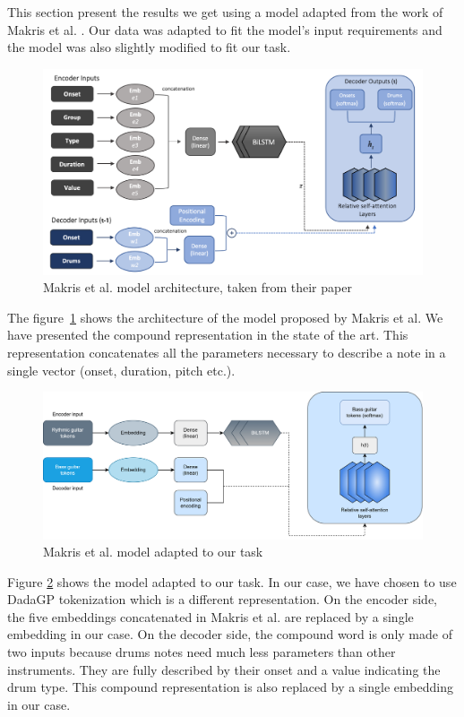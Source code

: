 This section present the results we get using a model adapted from the work of Makris et al. \cite{makris_conditional_2022}.
Our data was adapted to fit the model's input requirements and the model was also slightly modified to fit our task.

\begin{figure}[!ht]
    \centering
    \includegraphics[width=.75\linewidth]{../images-figures/makris_model.png}
    \caption{Makris et al. model architecture, taken from their paper \cite{makris_conditional_2022}}
    \label{fig:makris_model}
\end{figure}

The figure~\ref{fig:makris_model} shows the architecture of the model proposed by Makris et al.
We have presented the compound representation in the state of the art.
This representation concatenates all the parameters necessary to describe a note in a single vector (onset, duration, pitch etc.).

\begin{figure}[!ht]
    \centering
    \includegraphics[width=.9\linewidth]{../images-figures/model_adapted.png}
    \caption{Makris et al. model adapted to our task}
    \label{fig:makris_model_adapted}
\end{figure}

Figure \ref{fig:makris_model_adapted} shows the model adapted to our task.
In our case, we have chosen to use DadaGP tokenization which is a different representation.
On the encoder side, the five embeddings concatenated in Makris et al. are replaced by a single embedding in our case.
On the decoder side, the compound word is only made of two inputs because drums notes need much less parameters than other instruments.
They are fully described by their onset and a value indicating the drum type.
This compound representation is also replaced by a single embedding in our case.

